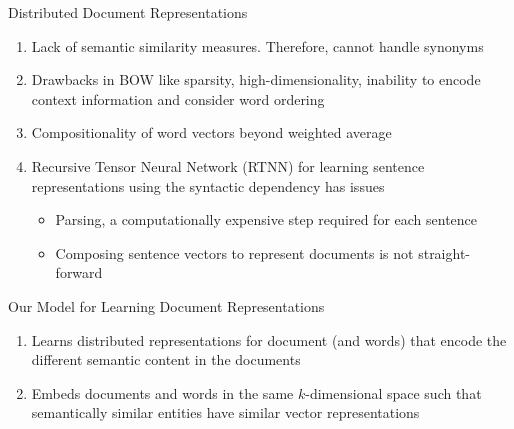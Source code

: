 \documentclass[10pt]{beamer}
\begin{document}
\begin{frame}{Distributed Document Representations}
\vfill {}
\begin{enumerate}
	\vfill\item<2-> Lack of semantic similarity measures. Therefore, cannot handle synonyms
	\vfill\item<3-> Drawbacks in BOW like sparsity, high-dimensionality, inability to encode context information and consider word ordering
	\vfill\item<4-> Compositionality of word vectors beyond weighted average \cite{mitchell2010composition, zanzotto2010estimating, yessenalina2011compositional, grefenstette2013multi, mikolov2013distributed} 
	\vfill\item<5-> Recursive Tensor Neural Network (RTNN) \cite{socher2013recursive} for learning sentence representations using the syntactic dependency has issues
	\begin{itemize}
		\vfill\item<5-> Parsing, a computationally expensive step required for each sentence
		\vfill\item<5-> Composing sentence vectors to represent documents is not straight-forward
	\end{itemize}
\end{enumerate}
\end{frame}



\begin{frame}{Our Model for Learning Document Representations}
\vfill {}
\vfill {}

\vfill {}
\begin{enumerate}
	\vfill\item<3-> Learns distributed representations for document (and words) that encode the different semantic content in the documents
	\vfill\item<3-> Embeds documents and words in the same $k$-dimensional space such that semantically similar entities have similar vector representations
\end{enumerate}

\end{frame}
\end{document}
